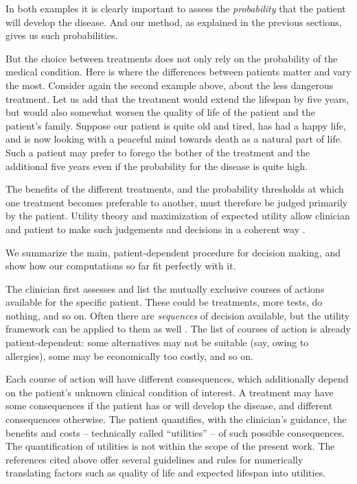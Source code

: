\documentclass[utf8]{FrontiersinHarvard} %
\renewcommand*{\|}[1][]{\nonscript\:#1\vert\nonscript\:\mathopen{}}
\begin{document}
In both examples it is clearly important to assess the \emph{probability} that the patient will develop the disease. And our method, as explained in the previous sections, gives us such probabilities.

But the choice between treatments does not only rely on the probability of the medical condition. Here is where the differences between patients matter and vary the most. Consider again the second example above, about the less dangerous treatment. Let us add that the treatment would extend the lifespan by five years, but would also somewhat worsen the quality of life of the patient and the patient's family. Suppose our patient is quite old and tired, has had a happy life, and is now looking with a peaceful mind towards death as a natural part of life. Such a patient may prefer to forego the bother of the treatment and the additional five years even if the probability for the disease is quite high.

The benefits of the different treatments, and the probability thresholds at which one treatment becomes preferable to another, must therefore be judged primarily by the patient. Utility theory and maximization of expected utility allow clinician and patient to make such judgements and decisions in a coherent way \citetext{\citealp{soxetal1988_r2013,huninketal2001_r2014}; see also the clear and charming exposition by \citealp{lindley1971_r1988}}.

We summarize the main, patient-dependent procedure for decision making, and show how our computations so far fit perfectly with it.

The clinician first assesses and list the mutually exclusive courses of actions available for the specific patient. These could be treatments, more tests, do nothing, and so on. Often there are \emph{sequences} of decision available, but the utility framework can be applied to them as well \citetext{see references above and \citealp{raiffa1968_r1970}}. The list of courses of action is already patient-dependent: some alternatives may not be suitable (say, owing to allergies), some may be economically too costly, and so on.

Each course of action will have different consequences, which additionally depend on the patient's unknown clinical condition of interest. A treatment may have some consequences if the patient has or will develop the disease, and different consequences otherwise. The patient quantifies, with the clinician's guidance, the benefits and costs -- technically called \enquote{utilities} -- of such possible consequences. The quantification of utilities is not within the scope of the present work. The references cited above offer several guidelines and rules for numerically translating factors such as quality of life and expected lifespan into utilities.
\end{document}
